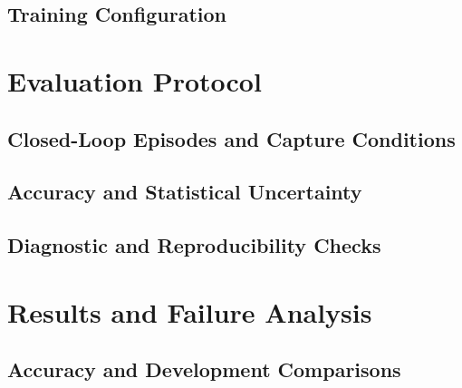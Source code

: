 \documentclass[conference]{IEEEtran}
\begin{document}
\subsection{Training Configuration}

\section{Evaluation Protocol}
\subsection{Closed-Loop Episodes and Capture Conditions}
\subsection{Accuracy and Statistical Uncertainty}
\subsection{Diagnostic and Reproducibility Checks}

\section{Results and Failure Analysis}
\subsection{Accuracy and Development Comparisons}
\end{document}

